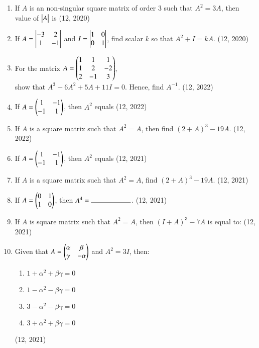 \begin{enumerate}[label=\thesubsection.\arabic*,ref=\thesubsection.\theenumi]
\item If $A$ is an non-singular square matrix  of order $3$ such that $A^2=3A$, then value of $\begin{vmatrix}A\end{vmatrix}$ is
\hfill (12, 2020)
\item If $A=\begin{vmatrix}-3&2\\ 1&-1\end{vmatrix}$ and $I=\begin{vmatrix}1&0\\ 0&1\end{vmatrix}$, find scalar $k$ so that $A^2+I=kA$.
\hfill (12, 2020)
\item For the matrix $A = \begin{pmatrix}1&1&1\\1&2&-2\\2&-1&3\end{pmatrix}$, \\show that $A^3 -6A^2 + 5A +11I = 0$. Hence, find $A^{-1}$.
\hfill (12, 2022)
\item If $A=\begin{pmatrix}1&-1\\-1&1\end{pmatrix}$, then $A^2$ equals 
\hfill (12, 2022)
\item If $A$ is a square matrix such that $A^2=A$, then find $(2+A)^3 -19A$.
\hfill (12, 2022)
    \item If $A = \begin{pmatrix}1 & -1 \\ -1 & 1\end{pmatrix}$, then $A^2$ equals
\hfill (12, 2021)
    \item If $A$ is a square matrix such that $A^2 = A$, find $(2+A)^3 - 19A$.
\hfill (12, 2021)
    \item If $A = \begin{pmatrix}0 & 1 \\ 1 & 0\end{pmatrix}$, then $A^4 = \rule{2cm}{0.15mm}$.
\hfill (12, 2021)
    \item If $A$ is square matrix such that $A^2 = A$, then $(I + A)^3 - 7A$ is equal to:
\hfill (12, 2021)
    \item Given that $A = \begin{pmatrix}\alpha & \beta \\ \gamma & -\alpha\end{pmatrix}$ and $A^2 = 3I$, then:
    \begin{enumerate}
        \item $1 + \alpha^2 + \beta\gamma = 0$
        \item $1 - \alpha^2 - \beta\gamma = 0$
        \item $3 - \alpha^2 - \beta\gamma = 0$
        \item $3 + \alpha^2 + \beta\gamma = 0$
    \end{enumerate}
\hfill (12, 2021)
\end{enumerate}
